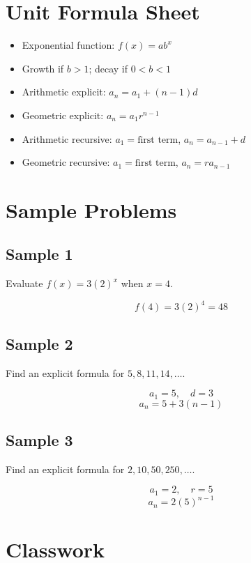\documentclass[11pt]{book}
\begin{document}
\section{Unit Formula Sheet}

\begin{itemize}
\item Exponential function: \(f(x)=ab^x\)
\item Growth if \(b>1\); decay if \(0<b<1\)
\item Arithmetic explicit: \(a_n=a_1+(n-1)d\)
\item Geometric explicit: \(a_n=a_1r^{n-1}\)
\item Arithmetic recursive: \(a_1=\text{first term}\), \(a_n=a_{n-1}+d\)
\item Geometric recursive: \(a_1=\text{first term}\), \(a_n=ra_{n-1}\)
\end{itemize}

\section{Sample Problems}

\subsection{Sample 1}

Evaluate \(f(x)=3(2)^x\) when \(x=4\).

\[f(4)=3(2)^4=48\]

\subsection{Sample 2}

Find an explicit formula for \(5,8,11,14,\ldots\).

\[a_1=5,\quad d=3\]
\[a_n=5+3(n-1)\]

\subsection{Sample 3}

Find an explicit formula for \(2,10,50,250,\ldots\).

\[a_1=2,\quad r=5\]
\[a_n=2(5)^{n-1}\]

\section{Classwork}
\end{document}
